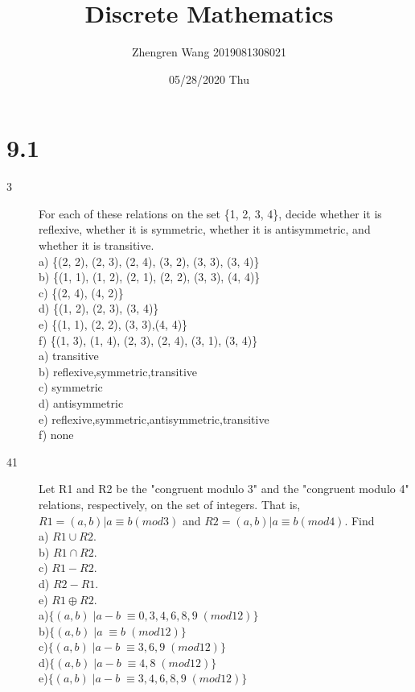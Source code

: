 \documentclass[UTF8]{article}
\title{Discrete Mathematics}
\author{Zhengren Wang 2019081308021}
\date{05/28/2020 Thu }
\begin{document}
\maketitle 

\part{9.1}
\begin{description}
    \item[3]For each of these relations on the set \{1, 2, 3, 4\}, decide whether it is reflexive, whether it is symmetric, whether it is antisymmetric, and whether it is transitive. \\
            a) \{(2, 2), (2, 3), (2, 4), (3, 2), (3, 3), (3, 4)\}	\\
            b) \{(1, 1), (1, 2), (2, 1), (2, 2), (3, 3), (4, 4)\} \\
            c) \{(2, 4), (4, 2)\}	\\
            d) \{(1, 2), (2, 3), (3, 4)\}	\\
            e) \{(1, 1), (2, 2), (3, 3),(4, 4)\}	\\
            f) \{(1, 3), (1, 4), (2, 3), (2, 4), (3, 1), (3, 4)\}	\\

            a) transitive                                   \\
            b) reflexive,symmetric,transitive               \\
            c) symmetric                                    \\
            d) antisymmetric                                \\
            e) reflexive,symmetric,antisymmetric,transitive \\
            f) none                                         \\


    \item[41]Let R1 and R2 be the "congruent modulo 3" and the "congruent modulo 4" relations, respectively, on the set of integers. That is, $R1 = {(a, b) | a \equiv b (mod 3)}$ and $R2 = {(a, b) | a \equiv b (mod 4)}$. Find  \\
             a) $R1 \cup R2. $   \\
             b) $R1 \cap R2. $  \\
             c) $R1 - R2. $  \\
             d) $R2 - R1. $  \\
             e) $R1 \oplus R2. $  \\

             a)$\{(a,b) \;| a-b \;\equiv 0,3,4,6,8,9 \;(mod 12)\}$   \\
             b)$\{(a,b) \;| a   \;\equiv b              \;(mod 12)\}$   \\
             c)$\{(a,b) \;| a-b \;\equiv 3,6,9       \;(mod 12)\}$   \\
             d)$\{(a,b) \;| a-b \;\equiv 4,8         \;(mod 12)\}$   \\
             e)$\{(a,b) \;| a-b \;\equiv 3,4,6,8,9   \;(mod 12)\}$   \\


\end{description}
\end{document}
